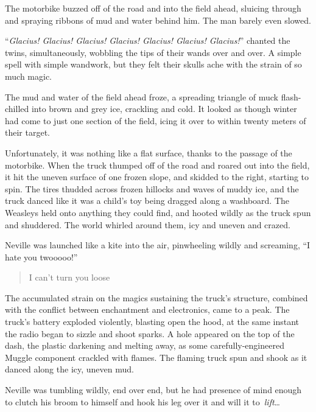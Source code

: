 The motorbike buzzed off of the road and into the field ahead, sluicing
through and spraying ribbons of mud and water behind him. The man barely
even slowed.

``\emph{Glacius! Glacius! Glacius! Glacius! Glacius! Glacius!
Glacius!}'' chanted the twins, simultaneously, wobbling the tips of
their wands over and over. A simple spell with simple wandwork, but they
felt their skulls ache with the strain of so much magic.

The mud and water of the field ahead froze, a spreading triangle of muck
flash-chilled into brown and grey ice, crackling and cold. It looked as
though winter had come to just one section of the field, icing it over
to within twenty meters of their target.

Unfortunately, it was nothing like a flat surface, thanks to the passage
of the motorbike. When the truck thumped off of the road and roared out
into the field, it hit the uneven surface of one frozen slope, and
skidded to the right, starting to spin. The tires thudded across frozen
hillocks and waves of muddy ice, and the truck danced like it was a
child's toy being dragged along a washboard. The Weasleys held onto
anything they could find, and hooted wildly as the truck spun and
shuddered. The world whirled around them, icy and uneven and crazed.

Neville was launched like a kite into the air, pinwheeling wildly and
screaming, ``I hate you twooooo!''\\

\begin{quote}
\noindent {} I can't turn you loose \\
\end{quote}

The accumulated strain on the magics sustaining the truck's structure,
combined with the conflict between enchantment and electronics, came to
a peak. The truck's battery exploded violently, blasting open the hood,
at the same instant the radio began to sizzle and shoot sparks. A hole
appeared on the top of the dash, the plastic darkening and melting away,
as some carefully-engineered Muggle component crackled with flames. The
flaming truck spun and shook as it danced along the icy, uneven mud.

Neville was tumbling wildly, end over end, but he had presence of mind
enough to clutch his broom to himself and hook his leg over it and will
it to~\emph{lift}\ldots{}\\

